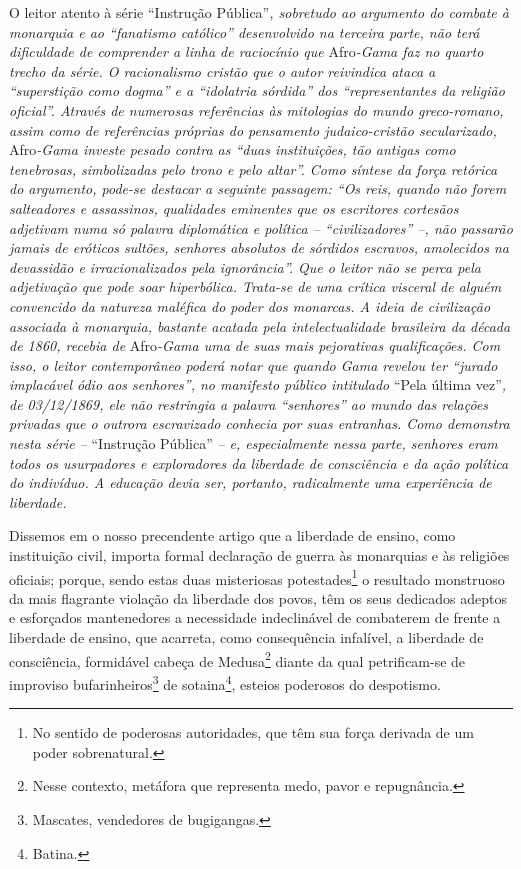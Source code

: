 \begin{didascalia}
O leitor atento à série ``Instrução Pública''\emph{, sobretudo ao
argumento do combate à monarquia e ao ``fanatismo católico'' desenvolvido
na terceira parte, não terá dificuldade de comprender a linha de
raciocínio que} Afro\emph{-Gama faz no quarto trecho da série. O
racionalismo cristão que o autor reivindica ataca a ``superstição como
dogma'' e a ``idolatria sórdida'' dos ``representantes da religião oficial''.
Através de numerosas referências às mitologias do mundo greco-romano,
assim como de referências próprias do pensamento judaico-cristão
secularizado,} Afro\emph{-Gama investe pesado contra as ``duas
instituições, tão antigas como tenebrosas, simbolizadas pelo trono e
pelo altar''. Como síntese da força retórica do argumento, pode-se
destacar a seguinte passagem: ``Os reis, quando não forem salteadores e
assassinos, qualidades eminentes que os escritores cortesãos adjetivam
numa só palavra diplomática e política -- ``civilizadores'' --, não
passarão jamais de eróticos sultões, senhores absolutos de sórdidos
escravos, amolecidos na devassidão e irracionalizados pela ignorância''.
Que o leitor não se perca pela adjetivação que pode soar hiperbólica.
Trata-se de uma crítica visceral de alguém convencido da natureza
maléfica do poder dos monarcas. A ideia de civilização associada à
monarquia, bastante acatada pela intelectualidade brasileira da década
de 1860, recebia de} Afro\emph{-Gama uma de suas mais pejorativas
qualificações. Com isso, o leitor contemporâneo poderá notar que quando
Gama revelou ter ``jurado implacável ódio aos senhores'', no manifesto
público intitulado} ``Pela última vez''\emph{, de 03/12/1869, ele não
restringia a palavra ``senhores'' ao mundo das relações privadas que o
outrora escravizado conhecia por suas entranhas. Como demonstra nesta
série --} ``Instrução Pública'' \emph{-- e, especialmente nessa parte,
senhores eram todos os usurpadores e exploradores da liberdade de
consciência e da ação política do indivíduo. A educação devia ser,
portanto, radicalmente uma experiência de liberdade.}
\end{didascalia}



Dissemos em o nosso precendente artigo que a liberdade de ensino, como
instituição civil, importa formal declaração de guerra às monarquias e
às religiões oficiais; porque, sendo estas duas misteriosas
potestades\footnote{No sentido de poderosas autoridades, que têm sua
  força derivada de um poder sobrenatural.} o resultado monstruoso da
mais flagrante violação da liberdade dos povos, têm os seus dedicados
adeptos e esforçados mantenedores a necessidade indeclinável de
combaterem de frente a liberdade de ensino, que acarreta, como
consequência infalível, a liberdade de consciência, formidável cabeça de
Medusa\footnote{Nesse contexto, metáfora que representa medo, pavor e
  repugnância.} diante da qual petrificam-se de improviso
bufarinheiros\footnote{Mascates, vendedores de bugigangas.} de
sotaina\footnote{Batina.}, esteios poderosos do despotismo.


